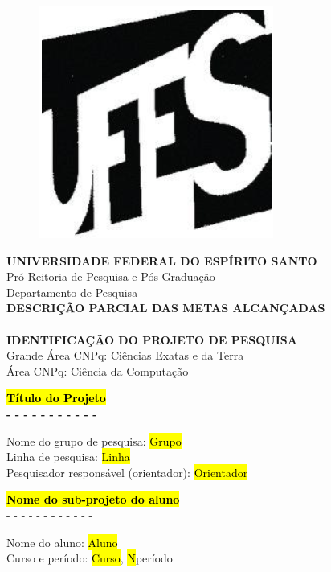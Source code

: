 \documentclass[10pt, a4paper]{article}
\begin{document}
\begin{center}
	\begin{figure}[h!]
	\centering
	\includegraphics[scale=0.5]{figuras/ufes}
	\end{figure}

	{\bf \Large UNIVERSIDADE FEDERAL DO ESPÍRITO SANTO}\\
	Pró-Reitoria de Pesquisa e Pós-Graduação\\
	Departamento de Pesquisa\\
	{\bf \Large DESCRIÇÃO PARCIAL DAS METAS ALCANÇADAS}\\
	\ \\
	{\bf \Large IDENTIFICAÇÃO DO PROJETO DE PESQUISA}\\
	Grande Área CNPq: Ciências Exatas e da Terra \\
	Área CNPq: Ciência da Computação
	
	\vspace{1cm}
	
	{\bf \Large \hl{Título do Projeto}}\\
	{\bf  - - - - - - - - - - -}
\end{center}
%
Nome do grupo de pesquisa: \hl{Grupo} \\
Linha de pesquisa: \hl{Linha} \\
Pesquisador responsável (orientador): \hl{Orientador}

\vspace{1.5cm}

\begin{center}
	{\bf \Large \hl{Nome do sub-projeto do aluno}}\\
	{- - - - - - - - - - - - }
\end{center}
%
Nome do aluno: \hl{Aluno} \\
Curso e período: \hl{Curso}, \hl{N}\textordmasculine período
\end{document}
